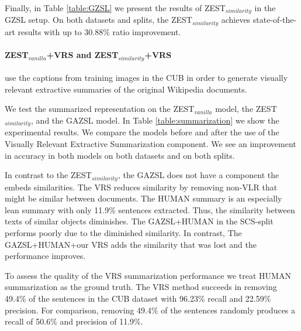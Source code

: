\documentclass[11pt,a4paper]{article}
\newcommand\reut[1]{\textcolor{green}{\textbf{REUT:} #1 }}
\begin{document}
Finally, 
in Table \ref{table:GZSL} we present the results of ZEST$_{similarity}$ in the GZSL setup. On both datasets and splits, the ZEST$_{similarity}$ achieves  state-of-the-art results with up to 30.88\% ratio improvement.

\paragraph{ ZEST$_{vanilla}$+VRS and ZEST$_{similarity}$+VRS }
use the captions from training images in the CUB in order to generate visually relevant extractive summaries of the original Wikipedia documents.

We test the summarized representation on the ZEST$_{vanilla}$ model, the ZEST$_{similarity}$, and the GAZSL \citep{zhu2018generative} model. In Table \ref{table:summarization} we show the experimental results. We compare the models before and after the use of the Visually Relevant Extractive Summarization component. We see an improvement in accuracy in both models on both datasets and on both splits. 

In contrast to the ZEST$_{similarity}$, the GAZSL does not have a component the embeds similarities. The VRS reduces similarity by removing non-VLR that might be similar between documents. 
The HUMAN summary is an especially lean summary with only 11.9\% sentences extracted. Thus, the similarity between texts of similar objects diminishes. The GAZSL+HUMAN in the SCS-split performs poorly due to the diminished similarity. In contrast, The GAZSL+HUMAN+our VRS adds the similarity that was lost and the performance improves.



To assess the quality of the VRS summarization performance we treat HUMAN summarization as the ground truth. The VRS method succeeds in removing 49.4\% of the sentences in the CUB dataset with 96.23\% recall and 22.59\% precision. For comparison, removing 49.4\% of the sentences randomly produces a recall of 50.6\% and precision of 11.9\%.
\end{document}
